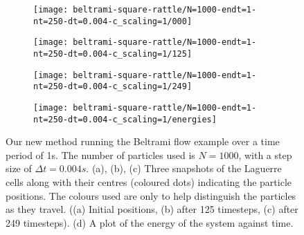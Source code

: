 \documentclass[11pt, oneside]{article}   	%
\newcommand{\dt}{\Delta t}
\begin{document}
\begin{figure}[h]
   \begin{subfigure}[t]{0.45\textwidth}
        \centering
        \texttt{[image: beltrami-square-rattle/N=1000-endt=1-nt=250-dt=0.004-c\_scaling=1/000]}
        \caption{} \label{fig:beltrami-flow-000}
    \end{subfigure}
   \begin{subfigure}[t]{0.45\textwidth}
        \centering
        \texttt{[image: beltrami-square-rattle/N=1000-endt=1-nt=250-dt=0.004-c\_scaling=1/125]}
        \caption{} \label{fig:beltrami-flow-125}
    \end{subfigure}
   \begin{subfigure}[t]{0.45\textwidth}
        \centering
	\texttt{[image: beltrami-square-rattle/N=1000-endt=1-nt=250-dt=0.004-c\_scaling=1/249]}
        \caption{} \label{fig:beltrami-flow-249}
    \end{subfigure}
   \begin{subfigure}[t]{0.45\textwidth}
        \centering
	\texttt{[image: beltrami-square-rattle/N=1000-endt=1-nt=250-dt=0.004-c\_scaling=1/energies]}
        \caption{} \label{fig:beltrami-flow-energies}
    \end{subfigure}
\centering
\caption{Our new method running the Beltrami flow example over a time period of 1s. The number of particles used is \(N = 1000\), with a step size of \(\dt = 0.004s\). (a), (b), (c) Three snapshots of the Laguerre cells along with their centres (coloured dots) indicating the particle positions. The colours used are only to help distinguish the particles as they travel. ((a) Initial positions, (b) after 125 timesteps, (c) after 249 timesteps). (d) A plot of the energy of the system against time. }
\centering
\label{fig:beltrami-flow}
\end{figure}
\end{document}
